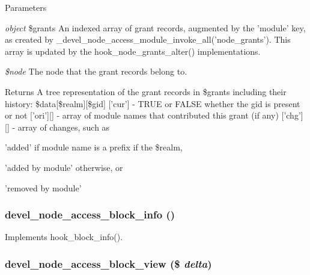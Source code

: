 \begin{DoxyParams}{Parameters}
\item[{\em object}]\$grants An indexed array of grant records, augmented by the 'module' key, as created by \_\-devel\_\-node\_\-access\_\-module\_\-invoke\_\-all('node\_\-grants'). This array is updated by the hook\_\-node\_\-grants\_\-alter() implementations.\item[{\em \$node}]The node that the grant records belong to.\end{DoxyParams}
\begin{DoxyReturn}{Returns}
A tree representation of the grant records in \$grants including their history: \$data\mbox{[}\$realm\mbox{]}\mbox{[}\$gid\mbox{]} \mbox{[}'cur'\mbox{]} -\/ TRUE or FALSE whether the gid is present or not \mbox{[}'ori'\mbox{]}\mbox{[}\mbox{]} -\/ array of module names that contributed this grant (if any) \mbox{[}'chg'\mbox{]}\mbox{[}\mbox{]} -\/ array of changes, such as
\begin{DoxyItemize}
\item 'added' if module name is a prefix if the \$realm,
\item 'added by module' otherwise, or
\item 'removed by module' 
\end{DoxyItemize}
\end{DoxyReturn}
\hypertarget{devel__node__access_8module_a2e24b01fdced9c434e1b8471835db857}{
\subsubsection[{devel\_\-node\_\-access\_\-block\_\-info}]{\setlength{\rightskip}{0pt plus 5cm}devel\_\-node\_\-access\_\-block\_\-info ()}}
\label{devel__node__access_8module_a2e24b01fdced9c434e1b8471835db857}
Implements hook\_\-block\_\-info(). \hypertarget{devel__node__access_8module_a0394c90f9987f4c074827f8bb366e3d0}{
\subsubsection[{devel\_\-node\_\-access\_\-block\_\-view}]{\setlength{\rightskip}{0pt plus 5cm}devel\_\-node\_\-access\_\-block\_\-view (\$ {\em delta})}}

